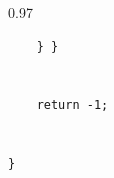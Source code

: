 \begin{figure}
\begin{center}
\begin{fmpage}{0.97\textwidth}
\begin{verbatim}
    } } 


    return -1; 


}


\end{verbatim}


\end{fmpage}


\end{center}


\vspace*{-9pt}




\vspace*{-6pt}


\end{figure}





